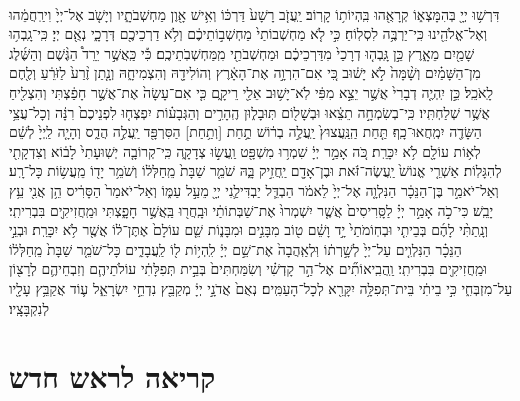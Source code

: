 \documentclass[twoside, openany, parskip=half, 11pt]{book}
\begin{document}
\begin{footnotesize}
\begin{multicols}{2}
\\
דִּרְשׁ֥וּ יְיָ֖ בְּהִמָּצְא֑וֹ קְרָאֻ֖הוּ בִּֽהְיוֹת֥וֹ קָרֽוֹב׃ יַֽעֲזֹ֤ב רָשָׁע֙ דַּרְכּ֔וֹ וְאִ֥ישׁ אָ֖וֶן מַחְשְׁבֹתָ֑יו וְיָשֹׁ֤ב אֶל־יְיָ֙ וִירַֽחֲמֵ֔הוּ וְאֶל־אֱלֹהֵ֖ינוּ כִּֽי־יַרְבֶּ֥ה לִסְלֽוֹחַ׃ כִּ֣י לֹ֤א מַחְשְׁבוֹתַי֙ מַחְשְׁב֣וֹתֵיכֶ֔ם וְלֹ֥א דַרְכֵיכֶ֖ם דְּרָכָ֑י נְאֻ֖ם יְיָ׃ כִּֽי־גָֽבְה֥וּ שָׁמַ֖יִם מֵאָ֑רֶץ כֵּ֣ן גָּֽבְה֤וּ דְרָכַי֙ מִדַּרְכֵיכֶ֔ם וּמַחְשְׁבֹתַ֖י מִֽמַּחְשְׁבֹֽתֵיכֶֽם׃ כִּ֡י כַּֽאֲשֶׁ֣ר יֵרֵד֩ הַגֶּ֨שֶׁם וְהַשֶּׁ֜לֶג מִן־הַשָּׁמַ֗יִם וְשָׁ֨מָּה֙ לֹ֣א יָשׁ֔וּב כִּ֚י אִם־הִרְוָ֣ה אֶת־הָאָ֔רֶץ וְהוֹלִידָ֖הּ וְהִצְמִיחָ֑הּ וְנָ֤תַן זֶ֨רַע֙ לַזֹּרֵ֔עַ וְלֶ֖חֶם לָֽאֹכֵֽל׃ כֵּ֣ן יִֽהְיֶ֤ה דְבָרִי֙ אֲשֶׁ֣ר יֵצֵ֣א מִפִּ֔י לֹֽא־יָשׁ֥וּב אֵלַ֖י רֵיקָ֑ם כִּ֤י אִם־עָשָׂה֙ אֶת־אֲשֶׁ֣ר חָפַ֔צְתִּי וְהִצְלִ֖יחַ אֲשֶׁ֥ר שְׁלַחְתִּֽיו׃ כִּֽי־בְשִׂמְחָ֣ה תֵצֵ֔אוּ וּבְשָׁל֖וֹם תּֽוּבָל֑וּן הֶֽהָרִ֣ים וְהַגְּבָע֗וֹת יִפְצְח֤וּ לִפְנֵיכֶם֙ רִנָּ֔ה וְכָל־עֲצֵ֥י הַשָּׂדֶ֖ה יִמְֽחֲאוּ־כָֽף׃ תַּ֤חַת הַֽנַּֽעֲצוּץ֙ יַֽעֲלֶ֣ה בְר֔וֹשׁ תְַ֥חַת [וְתַ֥חַת] הַסִּרְפָּ֖ד יַֽעֲלֶ֣ה הֲדַ֑ס וְהָיָ֤ה לַֽיְיָ֙ לְשֵׁ֔ם לְא֥וֹת עוֹלָ֖ם לֹ֥א יִכָּרֵֽת׃ כֹּ֚ה אָמַ֣ר יְיָ֔ שִׁמְר֥וּ מִשְׁפָּ֖ט וַֽעֲשׂ֣וּ צְדָקָ֑ה כִּֽי־קְרוֹבָ֤ה יְשֽׁוּעָתִי֙ לָב֔וֹא וְצִדְקָתִ֖י לְהִגָּלֽוֹת׃ אַשְׁרֵ֤י אֱנוֹשׁ֙ יַֽעֲשֶׂה־זֹּ֔את וּבֶן־אָדָ֖ם יַֽחֲזִ֣יק בָּ֑הּ שֹׁמֵ֤ר שַׁבָּת֙ מֵֽחַלְּל֔וֹ וְשֹׁמֵ֥ר יָד֖וֹ מֵֽעֲשׂ֥וֹת כָּל־רָֽע׃ וְאַל־יֹאמַ֣ר בֶּן־הַנֵּכָ֔ר הַנִּלְוָ֤ה אֶל־יְיָ֙ לֵאמֹ֔ר הַבְדֵּ֧ל יַבְדִּילַ֛נִי יְיָ֖ מֵעַ֣ל עַמּ֑וֹ וְאַל־יֹאמַר֙ הַסָּרִ֔יס הֵ֥ן אֲנִ֖י עֵ֥ץ יָבֵֽשׁ׃ כִּי־כֹ֣ה אָמַ֣ר יְיָ֗ לַסָּֽרִיסִים֙ אֲשֶׁ֤ר יִשְׁמְרוּ֙ אֶת־שַׁבְּתוֹתַ֔י וּבָֽחֲר֖וּ בַּֽאֲשֶׁ֣ר חָפָ֑צְתִּי וּמַֽחֲזִיקִ֖ים בִּבְרִיתִֽי׃ וְנָֽתַתִּ֨י לָהֶ֜ם בְּבֵיתִ֤י וּבְחֽוֹמֹתַי֙ יָ֣ד וָשֵׁ֔ם ט֖וֹב מִבָּנִ֣ים וּמִבָּנ֑וֹת שֵׁ֤ם עוֹלָם֙ אֶתֶּן־ל֔וֹ אֲשֶׁ֖ר לֹ֥א יִכָּרֵֽת׃ וּבְנֵ֣י הַנֵּכָ֗ר הַנִּלְוִ֤ים עַל־יְיָ֙ לְשָׁ֣רְת֔וֹ וּֽלְאַֽהֲבָה֙ אֶת־שֵׁ֣ם יְיָ֔ לִֽהְי֥וֹת ל֖וֹ לַֽעֲבָדִ֑ים כָּל־שֹׁמֵ֤ר שַׁבָּת֙ מֵֽחַלְּל֔וֹ וּמַֽחֲזִיקִ֖ים בִּבְרִיתִֽי׃ וַֽהֲבִֽיאוֹתִ֞ים אֶל־הַ֣ר קָדְשִׁ֗י וְשִׂמַּחְתִּים֙ בְּבֵ֣ית תְּפִלָּתִ֔י עוֹלֹתֵיהֶ֧ם וְזִבְחֵיהֶ֛ם לְרָצ֖וֹן עַל־מִזְבְּחִ֑י כִּ֣י בֵיתִ֔י בֵּית־תְּפִלָּ֥ה יִקָּרֵ֖א לְכָל־הָעַמִּֽים׃ נְאֻם֙ אֲדֹנָ֣י יְיָ֔ מְקַבֵּ֖ץ נִדְחֵ֣י יִשְׂרָאֵ֑ל ע֛וֹד אֲקַבֵּ֥ץ עָלָ֖יו לְנִקְבָּצָֽיו׃

\end{multicols}

\section[ראש חדש]{קריאה לראש חדש}



\end{footnotesize}
\end{document}
